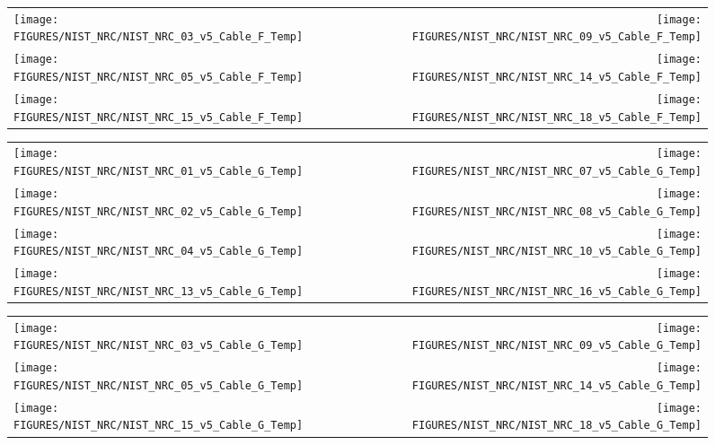 \begin{figure}[h!]
\begin{tabular*}{\textwidth}{l@{\extracolsep{\fill}}r}
\texttt{[image: FIGURES/NIST\_NRC/NIST\_NRC\_03\_v5\_Cable\_F\_Temp]} &
\texttt{[image: FIGURES/NIST\_NRC/NIST\_NRC\_09\_v5\_Cable\_F\_Temp]} \\
\texttt{[image: FIGURES/NIST\_NRC/NIST\_NRC\_05\_v5\_Cable\_F\_Temp]} &
\texttt{[image: FIGURES/NIST\_NRC/NIST\_NRC\_14\_v5\_Cable\_F\_Temp]} \\
\texttt{[image: FIGURES/NIST\_NRC/NIST\_NRC\_15\_v5\_Cable\_F\_Temp]} &
\texttt{[image: FIGURES/NIST\_NRC/NIST\_NRC\_18\_v5\_Cable\_F\_Temp]}
\end{tabular*}
\label{NIST_NRC_Cable_F_Open}
\end{figure}


\begin{figure}[h!]
\begin{tabular*}{\textwidth}{l@{\extracolsep{\fill}}r}
\texttt{[image: FIGURES/NIST\_NRC/NIST\_NRC\_01\_v5\_Cable\_G\_Temp]} &
\texttt{[image: FIGURES/NIST\_NRC/NIST\_NRC\_07\_v5\_Cable\_G\_Temp]} \\
\texttt{[image: FIGURES/NIST\_NRC/NIST\_NRC\_02\_v5\_Cable\_G\_Temp]} &
\texttt{[image: FIGURES/NIST\_NRC/NIST\_NRC\_08\_v5\_Cable\_G\_Temp]} \\
\texttt{[image: FIGURES/NIST\_NRC/NIST\_NRC\_04\_v5\_Cable\_G\_Temp]} &
\texttt{[image: FIGURES/NIST\_NRC/NIST\_NRC\_10\_v5\_Cable\_G\_Temp]} \\
\texttt{[image: FIGURES/NIST\_NRC/NIST\_NRC\_13\_v5\_Cable\_G\_Temp]} &
\texttt{[image: FIGURES/NIST\_NRC/NIST\_NRC\_16\_v5\_Cable\_G\_Temp]}
\end{tabular*}
\label{NIST_NRC_Cable_G_Closed}
\end{figure}

\begin{figure}[h!]
\begin{tabular*}{\textwidth}{l@{\extracolsep{\fill}}r}
\texttt{[image: FIGURES/NIST\_NRC/NIST\_NRC\_03\_v5\_Cable\_G\_Temp]} &
\texttt{[image: FIGURES/NIST\_NRC/NIST\_NRC\_09\_v5\_Cable\_G\_Temp]} \\
\texttt{[image: FIGURES/NIST\_NRC/NIST\_NRC\_05\_v5\_Cable\_G\_Temp]} &
\texttt{[image: FIGURES/NIST\_NRC/NIST\_NRC\_14\_v5\_Cable\_G\_Temp]} \\
\texttt{[image: FIGURES/NIST\_NRC/NIST\_NRC\_15\_v5\_Cable\_G\_Temp]} &
\texttt{[image: FIGURES/NIST\_NRC/NIST\_NRC\_18\_v5\_Cable\_G\_Temp]}
\end{tabular*}
\label{NIST_NRC_Cable_G_Open}
\end{figure}



